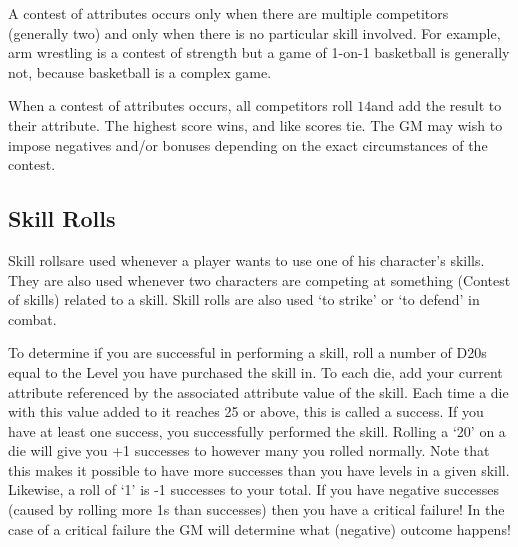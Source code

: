 \documentclass[twoside]{book}
\begin{document}
    {  
     A contest of attributes occurs only when there are
               multiple competitors (generally two) and only when there
               is no particular skill involved. For example, arm
               wrestling is a contest of strength but a game of 1-on-1
               basketball is generally not, because basketball is a
               complex game. 
    }
  
    {  
     When a contest of attributes occurs, all competitors
               roll \ensuremath{1}\ensuremath{4}\ensuremath{}and add the result to their attribute. The
               highest score wins, and like scores tie. The GM may wish
               to impose negatives and/or bonuses depending on the exact
               circumstances of the contest. 
    }
  
  

  

  
    

\subsection{Skill Rolls}
    
    {  
     Skill rollsare used whenever a player wants to use
               one of his character's skills. They are also used
               whenever two characters are competing at something
               (Contest of skills) related to a skill. Skill rolls are
               also used `to strike' or `to
               defend' in combat. 
    }
  
    {  
     To determine if you are successful in performing a
               skill, roll a number of D20s equal to the Level you have
               purchased the skill in. To each die, add your current
               attribute referenced by the associated attribute value of
               the skill. Each time a die with this value added to it
               reaches 25 or above, this is called a success. If you have
               at least one success, you successfully performed the
               skill. Rolling a `20' on a die will give you
               +1 successes to however many you rolled normally. Note
               that this makes it possible to have more successes than
               you have levels in a given skill. Likewise, a roll of
               `1' is -1 successes to your total. If you have
               negative successes (caused by rolling more 1s than
               successes) then you have a critical failure! In the case
               of a critical failure the GM will determine what
               (negative) outcome happens! 
    }
  
\end{document}
